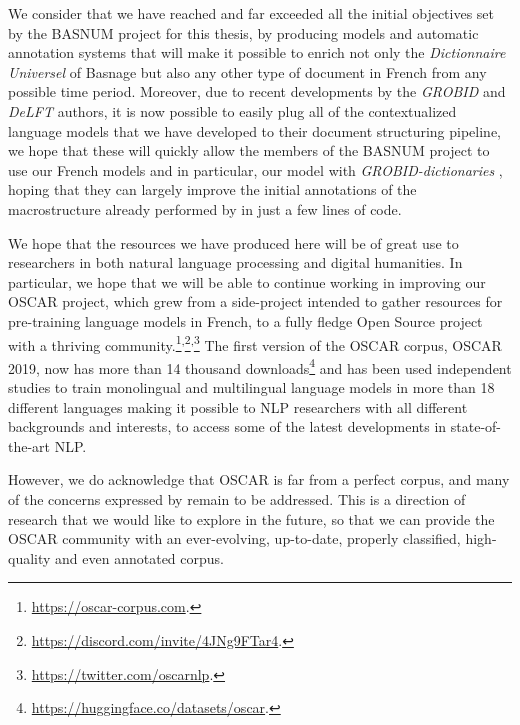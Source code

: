 We consider that we have reached and far exceeded all the initial objectives set by the BASNUM project for this thesis, by producing models and automatic annotation systems that will make it possible to enrich not only the \emph{Dictionnaire Universel} of Basnage but also any other type of document in French from any possible time period. Moreover, due to recent developments by the \emph{GROBID} \citep{lopez-etal-2018-grobid} and \emph{DeLFT} \citep{lopez-etal-2018-delft} authors, it is now possible to easily plug all of the contextualized language models that we have developed to their document structuring pipeline, we hope that these will quickly allow the members of the BASNUM project to use our French models and in particular, our \dalembert model with \emph{GROBID-dictionaries} \citep{khemakhem-etal-2017-automatic,khemakhem-etal-2018-enhancing}, hoping that they can largely improve the initial annotations of the macrostructure already performed by \citet{khemakhem-2020-standard} in just a few lines of code.

We hope that the resources we have produced here will be of great use to researchers in both natural language processing and digital humanities. In particular, we hope that we will be able to continue working in improving our OSCAR project, which grew from a side-project intended to gather resources for pre-training language models in French, to a fully fledge Open Source project with a thriving community.\footnote{\url{https://oscar-corpus.com}.}\textsuperscript{,}\footnote{\url{https://discord.com/invite/4JNg9FTar4}.}\textsuperscript{,}\footnote{\url{https://twitter.com/oscarnlp}.} The first version of the OSCAR corpus, OSCAR 2019, now has more than 14 thousand downloads\footnote{\url{https://huggingface.co/datasets/oscar}.} and has been used independent studies to train monolingual and multilingual language models in more than 18 different languages \citep{antoun-etal-2021-araelectra, kakwani-etal-2020-indicnlpsuite, wilie-etal-2020-indonlu, chan-etal-2020-germans, koutsikakis-etal-2020-greek, martin-etal-2020-camembert, chriqui-etal-2021-hebert, seker-etal-2021-alephbert, delobelle-etal-2020-robbert, dumitrescu-etal-2020-birth, masala-etal-2020-robert} making it possible to NLP researchers with all different backgrounds and interests, to access some of the latest developments in state-of-the-art NLP.

However, we do acknowledge that OSCAR is far from a perfect corpus, and many of the concerns expressed by \citet{caswell-etal-2020-language,kreutzer-etal-2021-quality} remain to be addressed. This is a direction of research that we would like to explore in the future, so that we can provide the OSCAR community with an ever-evolving, up-to-date, properly classified, high-quality and even annotated corpus.

